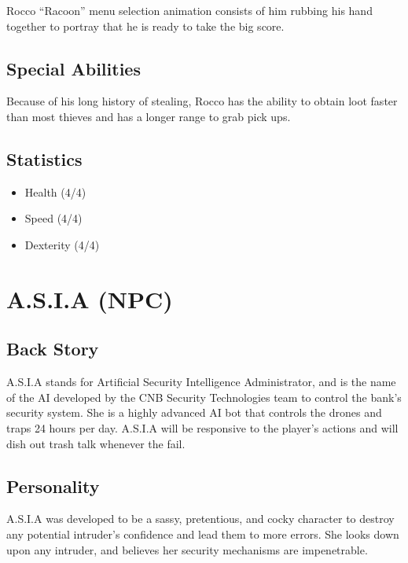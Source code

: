\documentclass[14pt]{report}
\begin{document}
Rocco ``Racoon'' menu selection animation consists of him rubbing his hand together to portray that he is ready to take the big score.

\subsection{Special Abilities}

Because of his long history of stealing, Rocco has the ability to obtain loot faster than most thieves and has a longer range to grab pick ups.

\subsection{Statistics}
\begin{itemize}
    \item Health (4/4)
    \item Speed (4/4)
    \item Dexterity (4/4)
\end{itemize}


\section{A.S.I.A (NPC)}


\subsection{Back Story}

A.S.I.A stands for Artificial Security Intelligence Administrator, and is the name of the AI developed by the CNB Security Technologies team to control the bank’s security system. She is a highly advanced AI bot that controls the drones and traps 24 hours per day. A.S.I.A will be responsive to the player’s actions and will dish out trash talk whenever the fail.

\subsection{Personality}

A.S.I.A was developed to be a sassy, pretentious, and cocky character to destroy any potential intruder’s confidence and lead them to more errors. She looks down upon any intruder, and believes her security mechanisms are impenetrable.
\end{document}
